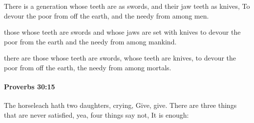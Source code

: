 			\begin{versebox}
					\item[BHS] 
					\item[ASV] There is a generation whose teeth are as swords, and their jaw teeth as knives, To devour the poor from off the earth, and the needy from among men.
					\item[NIV] those whose teeth are swords and whose jaws are set with knives to devour the poor from the earth and the needy from among mankind.
					\item[NRSV] there are those whose teeth are swords, whose teeth are knives, to devour the poor from off the earth, the needy from among mortals.
			\end{versebox}

		\paragraph{Proverbs 30:15} %
			\label{PROVERBS-30-15}

			The horseleach hath two daughters, crying, Give, give. There are three things that are never satisfied, yea, four things say not, It is enough:

